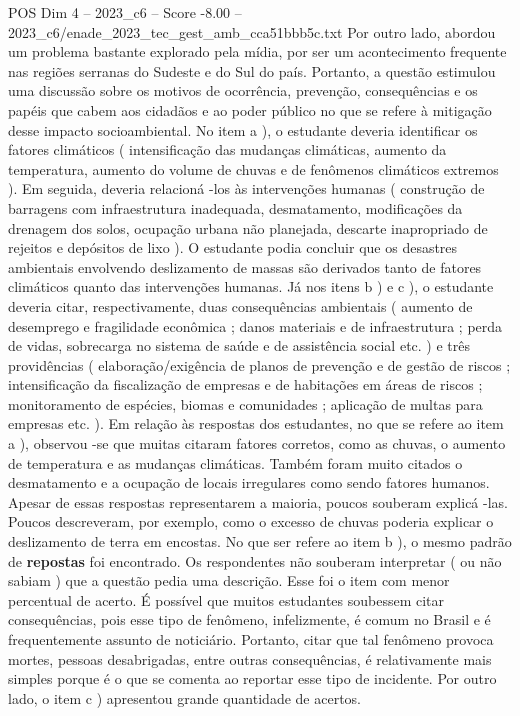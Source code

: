 \begin{textsample}{POS Dim 4 – 2023\_c6 – Score -8.00 – 2023\_c6/enade\_2023\_tec\_gest\_amb\_cca51bbb5c.txt}
Por outro lado, abordou um problema bastante explorado pela mídia, por ser um acontecimento frequente nas regiões serranas do Sudeste e do Sul do país.
Portanto, a questão estimulou uma discussão sobre os motivos de ocorrência, prevenção, consequências e os papéis que cabem aos cidadãos e ao poder público no que se refere à mitigação desse impacto socioambiental.
No item a ), o estudante deveria identificar os fatores climáticos ( intensificação das mudanças climáticas, aumento da temperatura, aumento do volume de chuvas e de fenômenos climáticos extremos ).
Em seguida, deveria relacioná -los às intervenções humanas ( construção de barragens com infraestrutura inadequada, desmatamento, modificações da drenagem dos solos, ocupação urbana não planejada, descarte inapropriado de rejeitos e depósitos de lixo ).
O estudante podia concluir que os desastres ambientais envolvendo deslizamento de massas são derivados tanto de fatores climáticos quanto das intervenções humanas.
Já nos itens b ) e c ), o estudante deveria citar, respectivamente, duas consequências ambientais ( aumento de desemprego e fragilidade econômica ; danos materiais e de infraestrutura ; perda de vidas, sobrecarga no sistema de saúde e de assistência social etc. ) e três providências ( elaboração/exigência de planos de prevenção e de gestão de riscos ; intensificação da fiscalização de empresas e de habitações em áreas de riscos ; monitoramento de espécies, biomas e comunidades ; aplicação de multas para empresas etc. ).
Em relação às respostas dos estudantes, no que se refere ao item a ), observou -se que muitas citaram fatores corretos, como as chuvas, o aumento de temperatura e as mudanças climáticas.
Também foram muito citados o desmatamento e a ocupação de locais irregulares como sendo fatores humanos.
Apesar de essas respostas representarem a maioria, poucos souberam explicá -las.
Poucos descreveram, por exemplo, como o excesso de chuvas poderia explicar o deslizamento de terra em encostas.
No que ser refere ao item b ), o mesmo padrão de \textbf{repostas} foi encontrado.
Os respondentes não souberam interpretar ( ou não sabiam ) que a questão pedia uma descrição.
Esse foi o item com menor percentual de acerto.
É possível que muitos estudantes soubessem citar consequências, pois esse tipo de fenômeno, infelizmente, é comum no Brasil e é frequentemente assunto de noticiário.
Portanto, citar que tal fenômeno provoca mortes, pessoas desabrigadas, entre outras consequências, é relativamente mais simples porque é o que se comenta ao reportar esse tipo de incidente.
Por outro lado, o item c ) apresentou grande quantidade de acertos.

\end{textsample}
